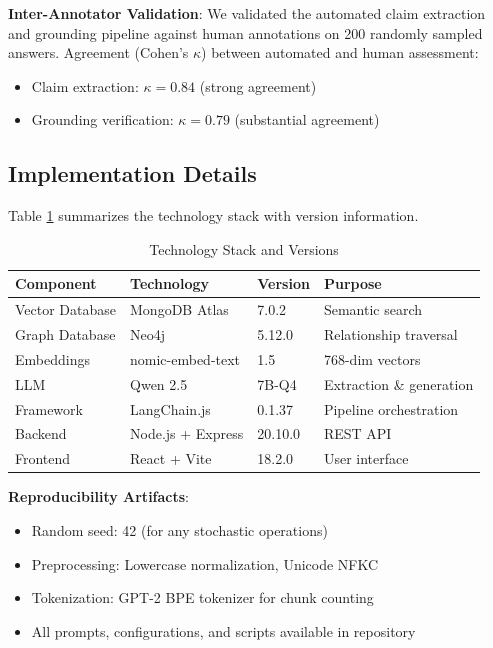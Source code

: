 \documentclass[conference]{IEEEtran}
\begin{document}
\textbf{Inter-Annotator Validation}: We validated the automated claim extraction and grounding pipeline against human annotations on 200 randomly sampled answers. Agreement (Cohen's $\kappa$) between automated and human assessment:
\begin{itemize}
    \item Claim extraction: $\kappa = 0.84$ (strong agreement)
    \item Grounding verification: $\kappa = 0.79$ (substantial agreement)
\end{itemize}

\subsection{Implementation Details}

Table \ref{tab:techstack} summarizes the technology stack with version information.

\begin{table}[htbp]
\caption{Technology Stack and Versions}
\label{tab:techstack}
\centering
\footnotesize
\begin{tabular}{llll}
\toprule
\textbf{Component} & \textbf{Technology} & \textbf{Version} & \textbf{Purpose} \\
\midrule
Vector Database & MongoDB Atlas & 7.0.2 & Semantic search \\
Graph Database & Neo4j & 5.12.0 & Relationship traversal \\
Embeddings & nomic-embed-text & 1.5 & 768-dim vectors \\
LLM & Qwen 2.5 & 7B-Q4 & Extraction \& generation \\
Framework & LangChain.js & 0.1.37 & Pipeline orchestration \\
Backend & Node.js + Express & 20.10.0 & REST API \\
Frontend & React + Vite & 18.2.0 & User interface \\
\bottomrule
\end{tabular}
\end{table}

\textbf{Reproducibility Artifacts}:
\begin{itemize}
    \item Random seed: 42 (for any stochastic operations)
    \item Preprocessing: Lowercase normalization, Unicode NFKC
    \item Tokenization: GPT-2 BPE tokenizer for chunk counting
    \item All prompts, configurations, and scripts available in repository
\end{itemize}
\end{document}
